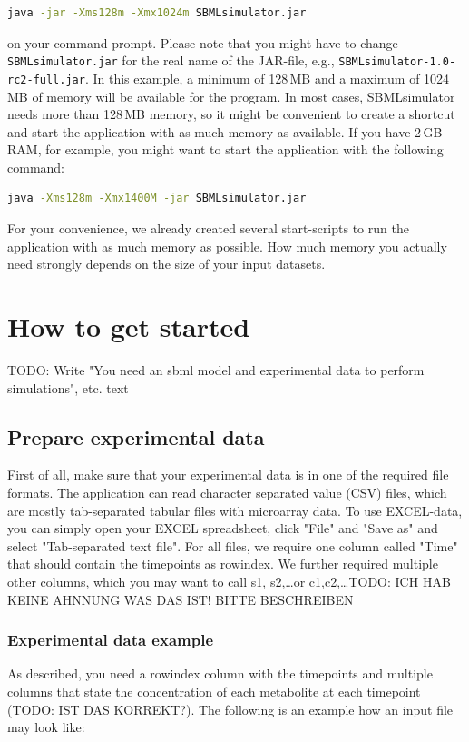 \begin{lstlisting}[language=bash,numbers=none]
java -jar -Xms128m -Xmx1024m SBMLsimulator.jar
\end{lstlisting}

\noindent on your command prompt. Please note that you might have to change
\texttt{SBMLsimulator.jar} for the real name of the JAR-file, e.g.,
\texttt{SBMLsimulator-1.0-rc2-full.jar}. In this example, a minimum of 128\,MB and a maximum
of 1024\,MB of memory will be available for the program. In most cases,
SBMLsimulator needs more than 128\,MB memory, so it might be convenient to create a
shortcut and start the application with as much memory as available. If you
have 2\,GB RAM, for example, you might want to start the application with the
following command:

\begin{lstlisting}[language=bash,numbers=none]
java -Xms128m -Xmx1400M -jar SBMLsimulator.jar
\end{lstlisting}

For your convenience, we already created several start-scripts to run the
application with as much memory as possible. How much memory you actually need
strongly depends on the size of your input datasets.
%


\chapter{How to get started}

TODO: Write "You need an sbml model and experimental data to perform simulations", etc. text

\section{Prepare experimental data}
\label{ch:prepare}

First of all, make sure that your experimental data is in one of the required file formats. The application can read character separated value (CSV) files, which are mostly tab-separated tabular files with microarray data. To use EXCEL-data, you can simply open your EXCEL spreadsheet, click "File" and "Save as" and select "Tab-separated text file".
For all files, we require one column called "Time" that should contain the timepoints as rowindex. We further required multiple other columns, which you may want to call s1, s2,\dots or c1,c2,\dots TODO: ICH HAB KEINE AHNNUNG WAS DAS IST! BITTE BESCHREIBEN

\subsection{Experimental data example}
As described, you need a rowindex column with the timepoints and multiple columns that state the concentration of each metabolite at each timepoint (TODO: IST DAS KORREKT?). The following is an example how an input file may look like:


